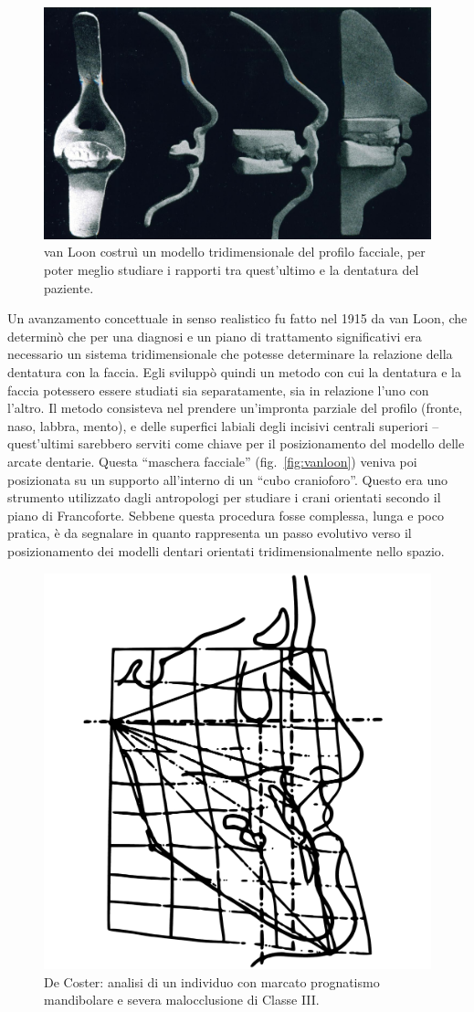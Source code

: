 \begin{figure}
\centering
\includegraphics[width=.7\textwidth]{./images/vanloon.jpg}
\caption{van Loon costruì un modello tridimensionale del profilo facciale, per poter meglio studiare i rapporti tra quest'ultimo e la dentatura del paziente.}
\label{fig:vanloon}
\end{figure}

Un avanzamento concettuale in senso realistico fu fatto nel 1915 da van Loon, che determinò che per una diagnosi e un piano di trattamento significativi era necessario un sistema tridimensionale che potesse determinare la relazione della dentatura con la faccia. Egli sviluppò quindi un metodo con cui la dentatura e la faccia potessero essere studiati sia separatamente, sia in relazione l'uno con l'altro. Il metodo consisteva nel prendere un'impronta parziale del profilo (fronte, naso, labbra, mento), e delle superfici labiali degli incisivi centrali superiori -- quest'ultimi sarebbero serviti come chiave per il posizionamento del modello delle arcate dentarie. Questa ``maschera facciale'' (fig.~\vref{fig:vanloon}) veniva poi posizionata su un supporto all'interno di un ``cubo cranioforo''. Questo era uno strumento utilizzato dagli antropologi per studiare i crani orientati secondo il piano di Francoforte. Sebbene questa procedura fosse complessa, lunga e poco pratica, è da segnalare in quanto rappresenta un passo evolutivo verso il posizionamento dei modelli dentari orientati tridimensionalmente nello spazio.

\begin{figure}
\centering
\includegraphics[width=.5\textwidth]{./images/decoster.pdf}
\caption{De Coster: analisi di un individuo con marcato prognatismo mandibolare e severa malocclusione di Classe III.}
\label{fig:decoster}
\end{figure}

